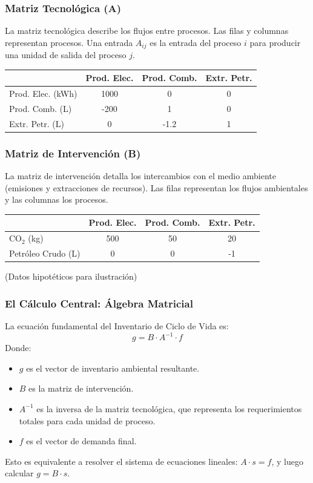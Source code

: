 \documentclass{beamer}
\begin{document}
\begin{frame}
  \frametitle{Matriz Tecnológica (A)}
  La matriz tecnológica describe los flujos entre procesos. Las filas y columnas representan procesos. Una entrada $A_{ij}$ es la entrada del proceso $i$ para producir una unidad de salida del proceso $j$.
  \begin{center}
  \begin{tabular}{l|ccc}
  \toprule
   & Prod. Elec. & Prod. Comb. & Extr. Petr. \\
  \midrule
  Prod. Elec. (kWh) & 1000 & 0 & 0 \\
  Prod. Comb. (L) & -200 & 1 & 0 \\
  Extr. Petr. (L) & 0 & -1.2 & 1 \\
  \bottomrule
  \end{tabular}
  \end{center}
\end{frame}

\begin{frame}
  \frametitle{Matriz de Intervención (B)}
  La matriz de intervención detalla los intercambios con el medio ambiente (emisiones y extracciones de recursos). Las filas representan los flujos ambientales y las columnas los procesos.
  \begin{center}
  \begin{tabular}{l|ccc}
  \toprule
   & Prod. Elec. & Prod. Comb. & Extr. Petr. \\
  \midrule
  CO$_2$ (kg) & 500 & 50 & 20 \\
  Petróleo Crudo (L) & 0 & 0 & -1 \\
  \bottomrule
  \end{tabular}
  \end{center}
  (Datos hipotéticos para ilustración)
\end{frame}

\begin{frame}
  \frametitle{El Cálculo Central: Álgebra Matricial}
  La ecuación fundamental del Inventario de Ciclo de Vida es:
  \begin{equation*}
    g = B \cdot A^{-1} \cdot f
  \end{equation*}
  Donde:
  \begin{itemize}
    \item $g$ es el vector de inventario ambiental resultante.
    \item $B$ es la matriz de intervención.
    \item $A^{-1}$ es la inversa de la matriz tecnológica, que representa los requerimientos totales para cada unidad de proceso.
    \item $f$ es el vector de demanda final.
  \end{itemize}
  Esto es equivalente a resolver el sistema de ecuaciones lineales: $A \cdot s = f$, y luego calcular $g = B \cdot s$.
\end{frame}
\end{document}
